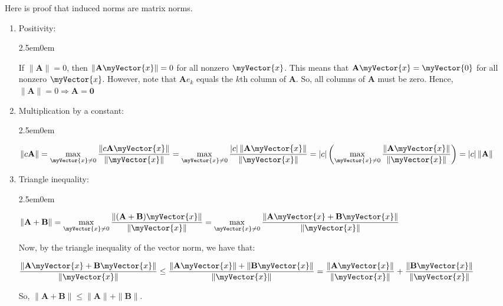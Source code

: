 \documentclass{book}
\newcommand{\hTwo}{%
   \color{MidnightBlue}%
   \fontsize{13}{15}\selectfont%
}
\newcommand{\hThree}{%
   \color{PineGreen}
   \fontsize{13}{15}\selectfont%
}
\newenvironment{myIndent}{%
   \begin{adjustwidth}{2.5em}{0em}%
}{%
   \end{adjustwidth}%
}
\newcommand{\mVec}[1]{\myVector{#1}}
\newcommand{\mMat}[1]{\mathbf{#1}}
\begin{document}
   Here is proof that induced norms are matrix norms. \hTwo
   \begin{enumerate}
      \item Positivity:
      {\begin{myIndent} \hThree
         If $\|\mMat{A}\| = 0$, then $\|\mMat{A}\mVec{x}\| = 0$ for all nonzero $\mVec{x}$. This means that $\mMat{A}\mVec{x} = \mVec{0}$ for all nonzero $\mVec{x}$. However, note that $\mMat{A}e_k$ equals the $k$th column of $\mMat{A}$. So, all columns of $\mMat{A}$ must be zero. Hence, $\|\mMat{A}\| = 0 \Longrightarrow \mMat{A} = \mMat{0}$
      \end{myIndent}}

      \item Multiplication by a constant:
      {\begin{myIndent} \hThree
         $\|c\mMat{A}\| = \max\limits_{\mVec{x} \neq 0}{\dfrac{\|c\mMat{A}\mVec{x}\|}{\|\mVec{x}\|}} = \max\limits_{\mVec{x} \neq 0}{\dfrac{\left|c\right|\|\mMat{A}\mVec{x}\|}{\|\mVec{x}\|}} = \left|c\right|\left(\max\limits_{\mVec{x} \neq 0}{\dfrac{\|\mMat{A}\mVec{x}\|}{\|\mVec{x}\|}}\right) = \left|c\right|\|\mMat{A}\|$
      \end{myIndent}}

      \item Triangle inequality:
      {\begin{myIndent} \hThree
         {\center $\|\mMat{A}+\mMat{B}\| = \max\limits_{\mVec{x} \neq 0}{\dfrac{\|(\mMat{A}+\mMat{B})\mVec{x}\|}{\|\mVec{x}\|}} = \max\limits_{\mVec{x} \neq 0}{\dfrac{\|\mMat{A}\mVec{x} + \mMat{B}\mVec{x}\|}{\|\mVec{x}\|}}$ \par} Now, by the triangle inequality of the vector norm, we have that:\\
         {\center $\dfrac{\|\mMat{A}\mVec{x} + \mMat{B}\mVec{x}\|}{\|\mVec{x}\|} \leq \dfrac{\|\mMat{A}\mVec{x}\| + \|\mMat{B}\mVec{x}\|}{\|\mVec{x}\|} = \dfrac{\|\mMat{A}\mVec{x}\|}{\|\mVec{x}\|} + \dfrac{\|\mMat{B}\mVec{x}\|}{\|\mVec{x}\|}$ \par} So, $\|\mMat{A}+\mMat{B}\| \leq \|\mMat{A}\| + \|\mMat{B}\|$.
      \end{myIndent}}
   \end{enumerate}
\end{document}
